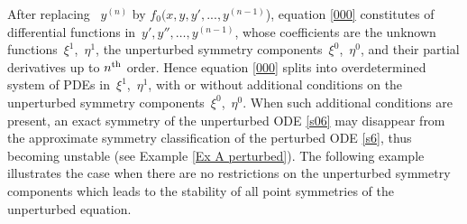 \documentclass[11pt,letter,subeqn]{article}
\begin{document}
After replacing \, $y^{(n)}$ by $f_0(x,y,y',..., y^{(n-1)}$), equation \eqref{000} constitutes of differential functions in\, $y',y'',\ldots, y^{(n-1)}$, whose coefficients are the unknown functions \,$\xi^1$,\, $\eta^1$, the unperturbed symmetry components \,$\xi^0$,\, $\eta^0$, and their partial derivatives up to $n^{\rm th}$ order. Hence equation \eqref{000} splits into overdetermined system of PDEs in \,$\xi^1$,\, $\eta^1$, with or without additional conditions on the unperturbed symmetry components \,$\xi^0$,\, $\eta^0$. When such additional conditions are present, an exact symmetry of the unperturbed ODE \eqref{s06} may disappear from the approximate symmetry classification of the perturbed ODE \eqref{s6}, thus becoming unstable (see Example \ref{Ex A perturbed}). The following example illustrates the case when there are no restrictions on the unperturbed symmetry components which leads to the {\textrm{stability}} of all point symmetries of the unperturbed equation.
\end{document}
